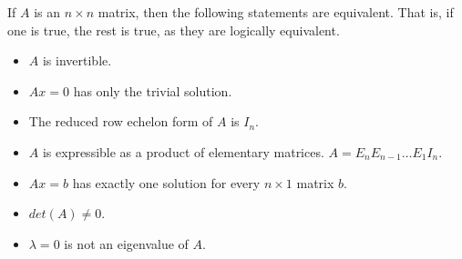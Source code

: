 \documentclass[12pt]{article}
\begin{document}
If $A$ is an $n \times n$ matrix, then the following statements are equivalent. That is, if one is true, the rest is true, as they are logically equivalent.
\begin{itemize}
    \item $A$ is invertible.
    \item $Ax = 0$ has only the trivial solution.
    \item The reduced row echelon form of $A$ is $I_n$.
    \item $A$ is expressible as a product of elementary matrices. $A = E_nE_{n-1}\dots E_1I_n$.
    \item $Ax = b$ has exactly one solution for every $n \times 1$ matrix $b$.
    \item $det(A) \neq 0$.
    \item $\lambda = 0$ is not an eigenvalue of $A$.
\end{itemize}
\end{document}

